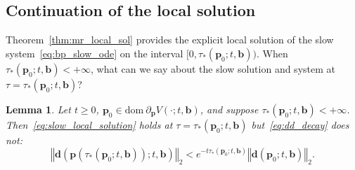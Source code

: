 \documentclass[11pt]{article}
\numberwithin{prop}{section}
\newtheorem{lem}{Lemma}[section]
\numberwithin{lem}{section}
\numberwithin{rem}{section}
\numberwithin{cor}{section}
\numberwithin{thm}{section}
\numberwithin{defn}{section}
\numberwithin{fact}{section}
\theoremstyle{plain}
\def\bb {\boldsymbol{b}}
\def\bd {\boldsymbol{d}}
\def\bp {\boldsymbol{p}}
\newcommand{\normtwo}[1]{\left\Vert{#1} \right\Vert_{2}}
\def\dom {\mathrm{dom~}}    %
\def\bpo {\bp_{0}}
\begin{document}
\subsection{Continuation of the local solution}\label{subsec:continuation}
Theorem~\ref{thm:mr_local_sol} provides the explicit local solution of the slow system~\eqref{eq:bp_slow_ode} on the interval $[0,\tau_{*}(\bpo;t,\bb))$. When $\tau_{*}(\bpo;t,\bb) < +\infty$, what can we say about the slow solution and system at $\tau = \tau_{*}(\bpo;t,\bb)$?
\begin{lem}\label{lem:discontinuity}
Let $t \geqslant 0$, $\bpo \in \dom \partial_{\bp} V(\cdot;t,\bb)$, and suppose $\tau_{*}(\bpo;t,\bb) < +\infty$. Then~\eqref{eq:slow_local_solution} holds at $\tau = \tau_{*}(\bpo;t,\bb)$ but~\eqref{eq:dd_decay} does not:
\begin{equation}\label{eq:dd_discontinuity}
\normtwo{\bd(\bp(\tau_{*}(\bpo;t,\bb));t,\bb)} < e^{-t\tau_{*}(\bpo;t,\bb)}\normtwo{\bd(\bpo;t,\bb)}.
\end{equation}
\end{lem}
\end{document}
